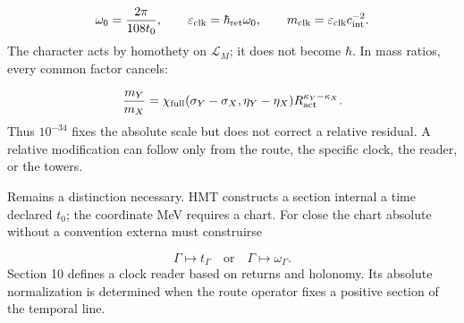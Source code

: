 \[
 \omega_0=\frac{2\pi}{108t_0},\qquad
 \varepsilon_{\rm clk}=\hbar_{\rm ret}\omega_0,
 \qquad
 m_{\rm clk}=\varepsilon_{\rm clk}c_{\rm int}^{-2}.
\]
The character acts by homothety on \(\mathcal L_M\); it does not become \(\hbar\). In mass ratios, every common factor cancels:

\[
 \frac{m_Y}{m_X}
 =\chi_{\rm full}(\sigma_Y-\sigma_X,\eta_Y-\eta_X)
 R_{\rm act}^{\kappa_Y-\kappa_X}.
\]
Thus \(10^{-34}\) fixes the absolute scale but does not correct a relative residual. A relative modification can follow only from the route, the specific clock, the reader, or the towers.

Remains a distinction necessary. HMT constructs a section internal a time declared \(t_0\); the coordinate MeV requires a chart. For close the chart absolute without a convention externa must construirse

\[
 \Gamma\longmapsto t_\Gamma
 \quad\text{or}\quad
 \Gamma\longmapsto\omega_\Gamma.
\]
Section 10 defines a clock reader based on returns and holonomy. Its absolute normalization is determined when the route operator fixes a positive section of the temporal line.

